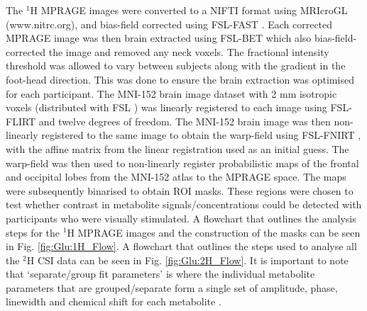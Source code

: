 The $^1$H \ac{MPRAGE} images were converted to a NIFTI format using MRIcroGL (www.nitrc.org), and bias-field corrected using FSL-FAST \cite{Zhang2001SegmentationAlgorithm}. Each corrected \ac{MPRAGE} image was then brain extracted using FSL-BET \cite{Smith2002FastExtraction} which also bias-field-corrected the image and removed any neck voxels. The fractional intensity threshold was allowed to vary between subjects along with the gradient in the foot-head direction. This was done to ensure the brain extraction was optimised for each participant. The MNI-152 brain image dataset with 2 mm isotropic voxels (distributed with FSL \cite{Smith2004AdvancesFSL}) was linearly registered to each image using FSL-FLIRT \cite{Jenkinson2001AImages, Jenkinson2002ImprovedImages} and twelve degrees of freedom. The MNI-152 brain image was then non-linearly registered to the same image to obtain the warp-field using FSL-FNIRT \cite{AnderssonJ2008FNIRT-FMRIBsTool}, with the affine matrix from the linear registration used as an initial guess. The warp-field was then used to non-linearly register probabilistic maps of the frontal and occipital lobes from the MNI-152 atlas to the \ac{MPRAGE} space. The maps were subsequently binarised to obtain \ac{ROI} masks. These regions were chosen to test whether contrast in metabolite signals/concentrations could be detected with participants who were visually stimulated. A flowchart that outlines the analysis steps for the $^1$H MPRAGE images and the construction of the masks can be seen in Fig. \ref{fig:Glu:1H_Flow}. A flowchart that outlines the steps used to analyse all the $^2$H \ac{CSI} data can be seen in Fig. \ref{fig:Glu:2H_Flow}. It is important to note that `separate/group fit parameters' is where the individual metabolite parameters that are grouped/separate form a single set of amplitude, phase, linewidth and chemical shift for each metabolite .


